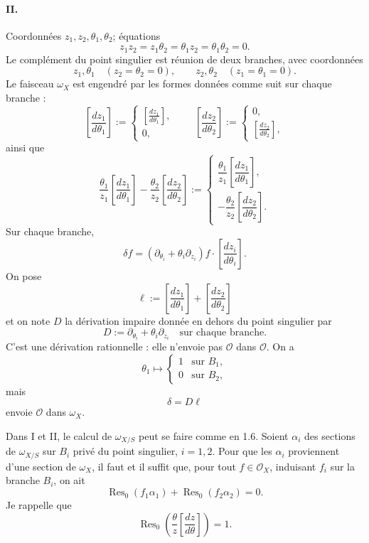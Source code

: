 \documentclass[11pt]{article}
\newcommand{\cO}{\mathcal O}
\newcommand{\Res}{\operatorname{Res}}
\begin{document}
\paragraph{II.}
Coordonnées $z_1,z_2,\theta_1,\theta_2$; équations
\[
  z_1z_2=z_1\theta_2=\theta_1z_2=\theta_1\theta_2=0.
\]
Le complément du point singulier est réunion de deux branches, avec coordonnées
\[
  z_1,\theta_1\quad (z_2=\theta_2=0),
  \qquad
  z_2,\theta_2\quad (z_1=\theta_1=0).
\]
Le faisceau $\omega_X$ est engendré par les formes données comme suit sur chaque branche :
\[
\left[\frac{dz_1}{d\theta_1}\right]
 :=
 \begin{cases}
 \left[\frac{dz_1}{d\theta_1}\right],\\ 0,
 \end{cases}
\qquad
\left[\frac{dz_2}{d\theta_2}\right]
 :=
 \begin{cases}
 0,\\ \left[\frac{dz_2}{d\theta_2}\right],
 \end{cases}
\]
ainsi que
\[
  \frac{\theta_1}{z_1}\left[\frac{dz_1}{d\theta_1}\right]
  -\frac{\theta_2}{z_2}\left[\frac{dz_2}{d\theta_2}\right]
  :=
  \begin{cases}
  \dfrac{\theta_1}{z_1}\left[\dfrac{dz_1}{d\theta_1}\right],\\[1.3ex]
  -\dfrac{\theta_2}{z_2}\left[\dfrac{dz_2}{d\theta_2}\right].
  \end{cases}
\]
Sur chaque branche,
\[
  \delta f=(\partial_{\theta_i}+\theta_i\partial_{z_i})f\cdot
  \left[\frac{dz_i}{d\theta_i}\right].
\]
On pose
\[
  \ell:=\left[\frac{dz_1}{d\theta_1}\right]
       +\left[\frac{dz_2}{d\theta_2}\right]
\]
et on note $D$ la dérivation impaire donnée en dehors du point singulier par
\[
  D:=\partial_{\theta_i}+\theta_i\partial_{z_i}
  \quad\text{sur chaque branche}.
\]
C'est une dérivation rationnelle : elle n'envoie pas $\cO$ dans $\cO$. On a
\[
  \theta_1\longmapsto
  \begin{cases}1&\text{sur }B_1,\\0&\text{sur }B_2,
  \end{cases}
\]
mais
\[
  \delta=D\ell
\]
envoie $\cO$ dans $\omega_X$.

Dans I et II, le calcul de $\omega_{X/S}$ peut se faire comme en 1.6. Soient $\alpha_i$ des sections de $\omega_{X/S}$ sur $B_i$ privé du point singulier, $i=1,2$. Pour que les $\alpha_i$ proviennent d'une section de $\omega_X$, il faut et il suffit que, pour tout $f\in\cO_X$, induisant $f_i$ sur la branche $B_i$, on ait
\[
  \Res_0(f_1\alpha_1)+\Res_0(f_2\alpha_2)=0.
\]
Je rappelle que
\[
  \Res_0\left(\frac{\theta}{z}\left[\frac{dz}{d\theta}\right]\right)=1.
\]
\end{document}
